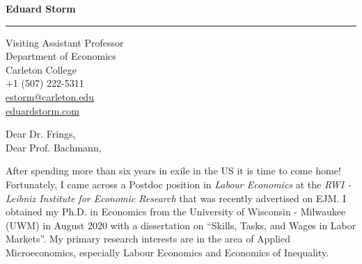 \documentclass[12pt]{letter} %
\begin{document}
\signature{\vspace{-25pt}Eduard Storm}           %
\longindentation=0pt                      %
\vspace{-10pt}\let\raggedleft\raggedright              %


\begin{letter}%
	
	
\date{\today}


\begin{flushleft}
\textbf{Eduard Storm}
\end{flushleft}
\hrule height 1pt
\begin{flushright}
\hfill Visiting Assistant Professor \\ \hfill Department of Economics \\ \hfill Carleton College \\ \hfill +1 (507) 222-5311 \\ \hfill \href{mailto:estorm@carleton.edu}{estorm@carleton.edu} \\ \hfill \href{https://eduardstorm.com/}{eduardstorm.com}
\end{flushright} 
 
 
\vspace*{-10pt}


\opening{\vspace{-10pt} Dear Dr. Frings,\\ Dear Prof. Bachmann,} 

After spending more than six years in exile in the US it is time to come home! Fortunately, I came across a Postdoc position in \textit{Labour Economics} at the \textit{RWI - Leibniz Institute for Economic Research} that was recently advertised on EJM. I obtained my Ph.D. in Economics from the University of Wisconsin - Milwaukee (UWM) in August 2020 with a dissertation on ``Skills, Tasks, and Wages in Labor Markets''. My primary research interests are in the area of Applied Microeconomics, especially Labour Economics and Economics of Inequality. 


\end{letter}
\end{document}
